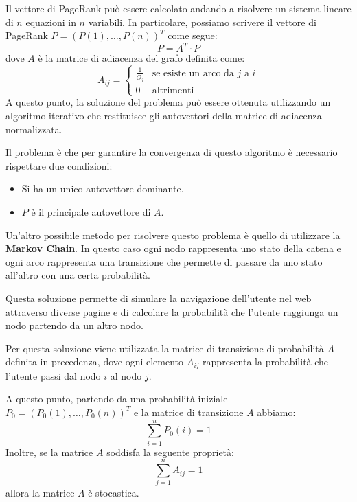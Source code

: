 Il vettore di PageRank può essere calcolato andando a risolvere un sistema
lineare di $n$ equazioni in $n$ variabili. In particolare, possiamo scrivere il
vettore di PageRank $P = (P(1), \dots, P(n))^T$ come segue:
\begin{equation}
    P = A^T \cdot P
\end{equation}
dove $A$ è la matrice di adiacenza del grafo definita come:
\begin{equation*}
    A_{ij} = \begin{cases}
        \frac{1}{O_j} & \text{se esiste un arco da $j$ a $i$} \\
        0             & \text{altrimenti}
    \end{cases}
\end{equation*}
A questo punto, la soluzione del problema può essere ottenuta utilizzando un
algoritmo iterativo che restituisce gli autovettori della matrice di adiacenza
normalizzata.

Il problema è che per garantire la convergenza di questo algoritmo è necessario
rispettare due condizioni:
\begin{itemize}
    \item Si ha un unico autovettore dominante.
    \item $P$ è il principale autovettore di $A$.
\end{itemize}

Un'altro possibile metodo per risolvere questo problema è quello di utilizzare
la \textbf{Markov Chain}. In questo caso ogni nodo rappresenta uno stato della
catena e ogni arco rappresenta una transizione che permette di passare da uno
stato all'altro con una certa probabilità.

Questa soluzione permette di simulare la navigazione dell'utente nel web
attraverso diverse pagine e di calcolare la probabilità che l'utente raggiunga
un nodo partendo da un altro nodo.

Per questa soluzione viene utilizzata la matrice di transizione di probabilità
$A$ definita in precedenza, dove ogni elemento $A_{ij}$ rappresenta la probabilità
che l'utente passi dal nodo $i$ al nodo $j$.

A questo punto, partendo da una probabilità iniziale $P_0 = (P_0(1), \dots, P_0(n))^T$
e la matrice di transizione $A$ abbiamo:
\begin{equation*}
    \sum_{i = 1}^n P_0(i) = 1
\end{equation*}
Inoltre, se la matrice $A$ soddisfa la seguente proprietà:
\begin{equation*}
    \sum_{j = 1}^n A_{ij} = 1
\end{equation*}
allora la matrice $A$ è stocastica.

